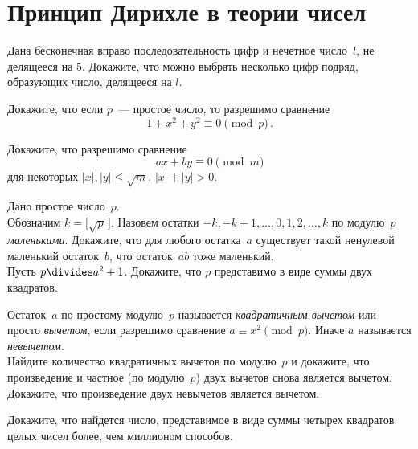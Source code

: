 
\section*{Принцип Дирихле в теории чисел}


\begin{problems}

\item
Дана бесконечная вправо последовательность цифр и нечетное число~$l$,
не делящееся на $5$.
Докажите, что можно выбрать несколько цифр подряд, образующих число, делящееся
на $l$.

\item
Докажите, что если $p$~--- простое число, то разрешимо сравнение
\[
    1 + x^2 + y^2 \equiv 0 \pmod{p}
\, . \]

\item
Докажите, что разрешимо сравнение
\[
    a x + b y \equiv 0 \pmod{m}
\]
для некоторых $\lvert x \rvert, \lvert y \rvert \leq \sqrt{m}$,
$\lvert x \rvert + \lvert y \rvert > 0$.

\item
Дано простое число~$p$.
\\
\subproblem
Обозначим $k = \bigl[ \sqrt{p} \, \bigr]$.
Назовем остатки $- k, - k + 1, \ldots, 0, 1, 2, \ldots, k$ по модулю~$p$
\emph{маленькими}.
Докажите, что для любого остатка~$a$ существует такой ненулевой маленький
остаток~$b$, что остаток~$a b$ тоже маленький.
\\
\subproblem
Пусть $p \divides a^2 + 1$.
Докажите, что $p$ представимо в виде суммы двух квадратов.


\item
Остаток~$a$ по простому модулю~$p$ называется \emph{квадратичным вычетом} или
просто \emph{вычетом}, если разрешимо сравнение $a \equiv x^2 \pmod{p}$.
Иначе $a$ называется \emph{невычетом}.
\\
\subproblem
Найдите количество квадратичных вычетов по модулю~$p$ и докажите, что
произведение и частное (по модулю~$p$) двух вычетов снова является вычетом.
\\
\subproblem
Докажите, что произведение двух невычетов является вычетом.

\item
Докажите, что найдется число, представимое в виде суммы четырех квадратов целых
чисел более, чем миллионом способов.

\end{problems}

